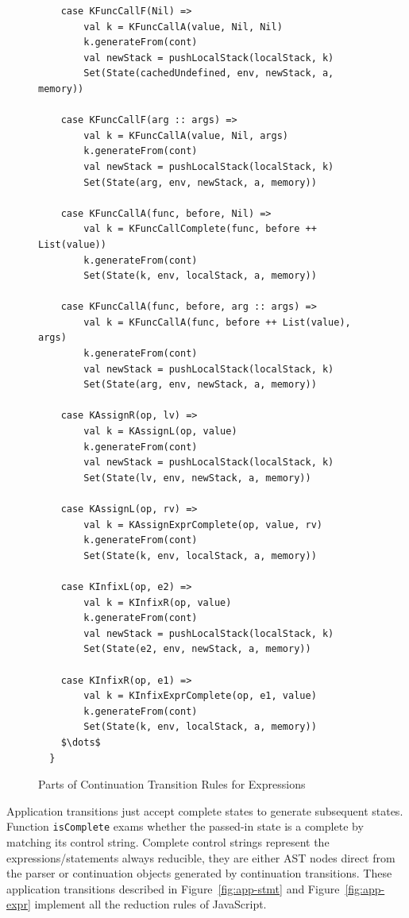 \documentclass{article}
\begin{document}
\begin{figure}
\lstset{language=Scala, mathescape}
\begin{lstlisting}
    case KFuncCallF(Nil) =>
        val k = KFuncCallA(value, Nil, Nil)
        k.generateFrom(cont)
        val newStack = pushLocalStack(localStack, k)
        Set(State(cachedUndefined, env, newStack, a, memory))

    case KFuncCallF(arg :: args) =>
        val k = KFuncCallA(value, Nil, args)
        k.generateFrom(cont)
        val newStack = pushLocalStack(localStack, k)
        Set(State(arg, env, newStack, a, memory))

    case KFuncCallA(func, before, Nil) =>
        val k = KFuncCallComplete(func, before ++ List(value))
        k.generateFrom(cont)
        Set(State(k, env, localStack, a, memory))

    case KFuncCallA(func, before, arg :: args) =>
        val k = KFuncCallA(func, before ++ List(value), args)
        k.generateFrom(cont)
        val newStack = pushLocalStack(localStack, k)
        Set(State(arg, env, newStack, a, memory))

    case KAssignR(op, lv) =>
        val k = KAssignL(op, value)
        k.generateFrom(cont)
        val newStack = pushLocalStack(localStack, k)
        Set(State(lv, env, newStack, a, memory))

    case KAssignL(op, rv) =>
        val k = KAssignExprComplete(op, value, rv)
        k.generateFrom(cont)
        Set(State(k, env, localStack, a, memory))

    case KInfixL(op, e2) =>
        val k = KInfixR(op, value)
        k.generateFrom(cont)
        val newStack = pushLocalStack(localStack, k)
        Set(State(e2, env, newStack, a, memory))

    case KInfixR(op, e1) =>
        val k = KInfixExprComplete(op, e1, value)
        k.generateFrom(cont)
        Set(State(k, env, localStack, a, memory))
    $\dots$
  }
\end{lstlisting}
\caption{Parts of Continuation Transition Rules for Expressions}
\label{fig:cont-expr}
\end{figure}

Application transitions just accept complete states to generate subsequent states. Function \verb|isComplete| exams whether the passed-in state is a complete by matching its control string. Complete control strings represent the expressions/statements always reducible, they are either AST nodes direct from the parser or continuation objects generated by continuation transitions. These application transitions described in Figure~\ref{fig:app-stmt} and Figure~\ref{fig:app-expr} implement all the reduction rules of JavaScript.
\end{document}
